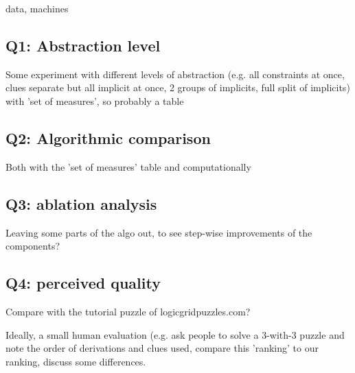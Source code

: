 data, machines

\subsection{Q1: Abstraction level}
Some experiment with different levels of abstraction (e.g. all constraints at once, clues separate but all implicit at once, 2 groups of implicits, full split of implicits)
with 'set of measures', so probably a table

\subsection{Q2: Algorithmic comparison}
Both with the 'set of measures' table and computationally

\subsection{Q3: ablation analysis}
Leaving some parts of the algo out, to see step-wise improvements of the components?

\subsection{Q4: perceived quality}
Compare with the tutorial puzzle of logicgridpuzzles.com?

Ideally, a small human evaluation (e.g. ask people to solve a 3-with-3 puzzle and note the order of derivations and clues used, compare this 'ranking' to our ranking, discuss some differences.